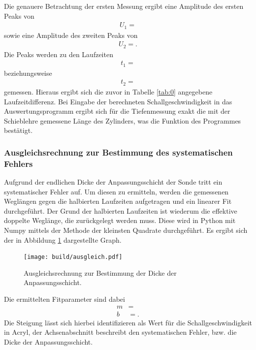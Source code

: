 Die genauere Betrachtung der ersten Messung ergibt eine Amplitude des ersten Peaks von
\begin{align*}
  U_1 = 
\end{align*}
sowie eine Amplitude des zweiten Peaks von
\begin{align*}
  U_2 = .
\end{align*}
Die Peaks werden zu den Laufzeiten
\begin{align*}
  t_1 = 
\end{align*}
beziehungsweise
\begin{align*}
  t_2 = 
\end{align*}
gemessen.
Hieraus ergibt sich die zuvor in Tabelle \ref{tab:0} angegebene Laufzeitdifferenz.
Bei Eingabe der berechneten Schallgeschwindigkeit in das Auswertungsprogramm ergibt sich für die Tiefenmessung exakt die mit der Schieblehre gemessene Länge des Zylinders, was die Funktion des Programmes bestätigt. %

\subsubsection{Ausgleichsrechnung zur Bestimmung des systematischen Fehlers}
Aufgrund der endlichen Dicke der Anpassungsschicht der Sonde tritt ein systematischer Fehler auf.
Um diesen zu ermitteln, werden die gemessenen Weglängen gegen die halbierten Laufzeiten aufgetragen und ein linearer Fit durchgeführt.
Der Grund der halbierten Laufzeiten ist wiederum die effektive doppelte Weglänge, die zurückgelegt werden muss.
Diese wird in Python mit Numpy mittels der Methode der kleinsten Quadrate durchgeführt.
Es ergibt sich der in Abbildung \ref{fig:plot1} dargestellte Graph.
\begin{figure}
  \centering
  \texttt{[image: build/ausgleich.pdf]}
  \caption{Ausgleichsrechnung zur Bestimmung der Dicke der Anpassungsschicht.}
  \label{fig:plot1}
\end{figure}
Die ermittelten Fitparameter sind dabei
\begin{align*}
  m &=  \\
  b &= .
\end{align*}
Die Steigung lässt sich hierbei identifizieren als Wert für die Schallgeschwindigkeit in Acryl, der Achsenabschnitt beschreibt den systematischen Fehler, bzw. die Dicke der Anpassungsschicht.

